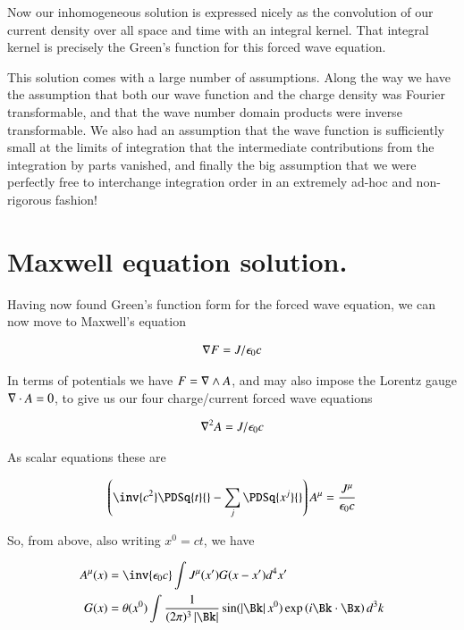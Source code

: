 Now our inhomogeneous solution is expressed nicely as the convolution of our current density over all space and time
with an integral kernel.  That integral kernel is precisely the Green's function for this forced wave equation.

This solution comes with a large number of assumptions.  Along the way we have the assumption that both our wave function
and the charge density was Fourier transformable, and that the wave number domain products were inverse transformable.  We
also had an assumption that the
wave function is sufficiently small at the limits of integration that the intermediate contributions from the 
integration by parts vanished, and finally the big assumption that we were perfectly free to interchange integration order
in an extremely ad-hoc and non-rigorous fashion!

\section{Maxwell equation solution. }

Having now found Green's function form for the forced wave equation, we can now move to Maxwell's equation

\begin{align*}
\nabla F = J/\epsilon_0 c
\end{align*}

In terms of potentials we have $F = \nabla \wedge A$, and may also impose the Lorentz gauge $\nabla \cdot A = 0$, to give us our four charge/current forced wave equations

\begin{align*}
\nabla^2 A = J/\epsilon_0 c
\end{align*}

As scalar equations these are

\begin{align}
\left( \inv{c^2} \PDSq{t}{} -\sum_j \PDSq{x^j}{} \right) A^\mu = \frac{J^\mu}{\epsilon_0 c}
\end{align}

So, from above, also writing $x^0 = ct$, we have

\begin{align}\label{eqn:fourier_maxwell:fourVectorPotentials}
{A^\mu}(x)
&= \inv{\epsilon_0 c} \int J^\mu(x') G(x - x') d^4 x' \\
G(x)
&= \theta(x^0) \int
\frac{1}{(2\pi)^3 \Abs{\Bk}}
\sin( \Abs{\Bk} x^0 )
\exp\left( i \Bk \cdot \Bx \right)
d^3 k
\end{align}

